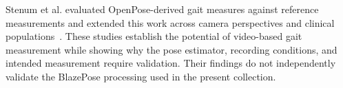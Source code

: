 Stenum et al. evaluated OpenPose-derived gait measures against reference measurements and extended this work across camera perspectives and clinical populations~\cite{stenum2021,stenum2024}. These studies establish the potential of video-based gait measurement while showing why the pose estimator, recording conditions, and intended measurement require validation. Their findings do not independently validate the BlazePose processing used in the present collection.
